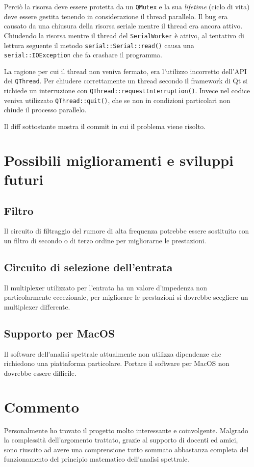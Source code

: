 Perci\`o la risorsa deve essere protetta da un \texttt{QMutex} e la sua
\emph{lifetime} (ciclo di vita) deve essere gestita tenendo in considerazione
il thread parallelo.  Il bug era causato da una chiusura della risorsa seriale
mentre il thread era ancora attivo.  Chiudendo la risorsa mentre il thread del
\texttt{SerialWorker} \`e attivo, al tentativo di lettura seguente il metodo
\texttt{serial::Serial::read()} causa una \texttt{serial::IOException} che fa
crashare il programma.

La ragione per cui il thread non veniva fermato, era l'utilizzo incorretto
dell'API dei \texttt{QThread}. Per chiudere correttamente un thread secondo il
framework di Qt si richiede un interruzione con
\texttt{QThread::requestInterruption()}. Invece nel codice veniva utilizzato
\texttt{QThread::quit()}, che se non in condizioni particolari non chiude il
processo parallelo.

Il diff  sottostante mostra il commit in cui il problema viene risolto.


\section{Possibili miglioramenti e sviluppi futuri}
\subsection{Filtro}
Il circuito di filtraggio del rumore di alta frequenza potrebbe essere
sostituito con un filtro di secondo o di terzo ordine per migliorarne le
prestazioni.

\subsection{Circuito di selezione dell'entrata}
Il multiplexer utilizzato per l'entrata ha un valore d'impedenza non
particolarmente eccezionale, per migliorare le prestazioni si dovrebbe
scegliere un multiplexer differente.

\subsection{Supporto per MacOS}
Il software dell'analisi spettrale attualmente non utilizza dipendenze che
richiedono una piattaforma particolare. Portare il software per MacOS non
dovrebbe essere difficile.

\section{Commento}
Personalmente ho trovato il progetto molto interessante e coinvolgente.
Malgrado la complessit\`a dell'argomento trattato, grazie al supporto di
docenti ed amici, sono riuscito ad avere una comprensione tutto sommato
abbastanza completa del funzionamento del principio matematico dell'analisi
spettrale.

